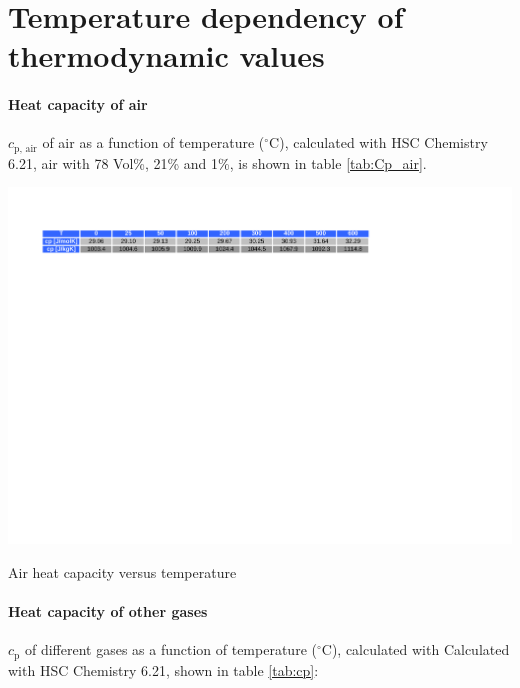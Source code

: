 \documentclass[11pt,a4paper,english,twoside]{scrreprt}
\newcommand{\gradC}{${}^\circ$C}      %
\begin{document}
\section{Temperature dependency of thermodynamic values}
\label{sec:Tdependency}

\paragraph{Heat capacity of air} $c_\text{p, air}$ of air as a function of temperature (\gradC), calculated with HSC Chemistry 6.21, air with 78 Vol\%, 21\% and 1\%, is shown in table \ref{tab:Cp_air}.

\begin{table}
  \centering
  \includegraphics*[width=\textwidth,angle=0]{FCF_Table_cp_air.pdf}
  \caption[Air heat capacity versus temperature]{Air heat capacity versus temperature}
  \label{tab:Cp_air}
\end{table}

\paragraph{Heat capacity of other gases} $c_\text{p}$ of different gases as a function of temperature (\gradC), calculated with Calculated with HSC Chemistry 6.21, shown in table \ref{tab:cp}:
\end{document}
